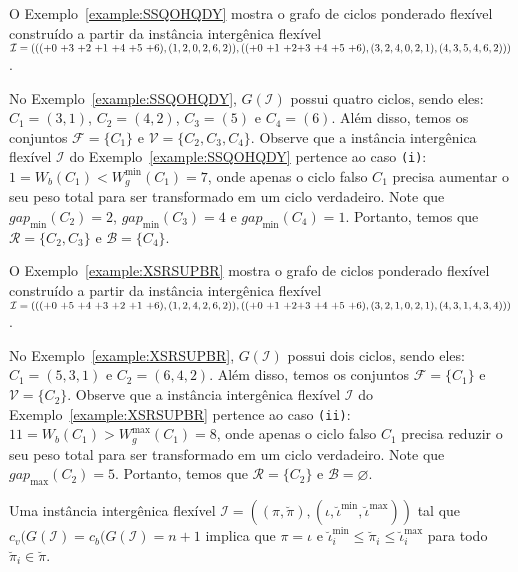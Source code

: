 O Exemplo~\ref{example:SSQOHQDY} mostra o grafo de ciclos ponderado flexível construído a partir da instância intergênica flexível $\mathcal{I} = ((({+0}~{+3}~{+2}~{+1}~{+4}~{+5}~{+6}),(1,2,0,2,6,2)),(({+0}~{+1}~{+2}\break{+3}~{+4}~{+5}~{+6}),(3,2,4,0,2,1),(4,3,5,4,6,2)))$.



No Exemplo~\ref{example:SSQOHQDY}, $G(\mathcal{I})$ possui quatro ciclos, sendo eles: $C_1 = (3,1)$, $C_2 = (4,2)$, $C_3 = (5)$ e $C_4=(6)$. Além disso, temos os conjuntos $\mathcal{F} = \{C_1\}$ e $\mathcal{V} = \{C_2,C_3,C_4\}$. Observe que a instância intergênica flexível $\mathcal{I}$ do Exemplo~\ref{example:SSQOHQDY} pertence ao caso \texttt{(i)}: $1 = W_b(C_1) < W^{\min}_g(C_1) = 7$, onde apenas o ciclo falso $C_1$ precisa aumentar o seu peso total para ser transformado em um ciclo verdadeiro. Note que $gap_{\min}(C_2) = 2$, $gap_{\min}(C_3) = 4$ e $gap_{\min}(C_4) = 1$. Portanto, temos que $\mathcal{R} = \{C_2, C_3\}$ e $\mathcal{B} = \{C_4\}$.

O Exemplo~\ref{example:XSRSUPBR} mostra o grafo de ciclos ponderado flexível construído a partir da instância intergênica flexível $\mathcal{I} = ((({+0}~{+5}~{+4}~{+3}~{+2}~{+1}~{+6}),(1,2,4,2,6,2)),(({+0}~{+1}~{+2}\break{+3}~{+4}~{+5}~{+6}),(3,2,1,0,2,1),(4,3,1,4,3,4)))$.



No Exemplo~\ref{example:XSRSUPBR}, $G(\mathcal{I})$ possui dois ciclos, sendo eles: $C_1 = (5,3,1)$ e $C_2 = (6,4,2)$. Além disso, temos os conjuntos $\mathcal{F} = \{C_1\}$ e $\mathcal{V} = \{C_2\}$. Observe que a instância intergênica flexível $\mathcal{I}$ do Exemplo~\ref{example:XSRSUPBR} pertence ao caso \texttt{(ii)}: $11 = W_b(C_1) > W^{\max}_g(C_1) = 8$, onde apenas o ciclo falso $C_1$ precisa reduzir o seu peso total para ser transformado em um ciclo verdadeiro. Note que $gap_{\max}(C_2) = 5$. Portanto, temos que $\mathcal{R} = \{C_2\}$ e $\mathcal{B} = \varnothing$.

\begin{remark}\label{remark:HLVDQLCE}
Uma instância intergênica flexível $\mathcal{I} = ((\pi,\breve\pi),(\iota,\breve\iota^{\min},\breve\iota^{\max}))$ tal que $c_v(G(\mathcal{I}) = c_b(G(\mathcal{I}) = n+1$ implica que $\pi = \iota$ e $\breve\iota^{\min}_i \le \breve\pi_i \le \breve\iota^{\max}_i$ para todo $\breve\pi_i \in \breve\pi$.
\end{remark}